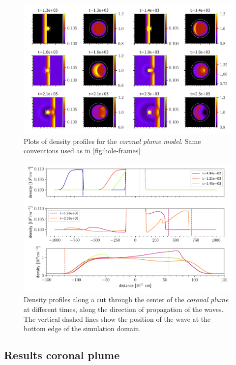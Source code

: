 \begin{figure}[H]
	\centering
	\includegraphics[width=\linewidth]{images/plume-frames.pdf}
	\caption{Plots of density profiles for the \emph{coronal plume model}. Same conventions used as in \cref{fig:hole-frames}}
	\label{fig:plume-frames}
\end{figure}

\begin{figure}[H]
	\centering
	\includegraphics[width=\linewidth]{images/plume-sections.pdf}
	\caption{Density profiles along a cut through the center of the \emph{coronal plume} at different times, along the direction of propagation of the waves.
	The vertical dashed lines show the position of the wave at the bottom edge of the simulation domain.}
	\label{fig:plume-sections}
\end{figure}

\subsection{Results coronal plume}

